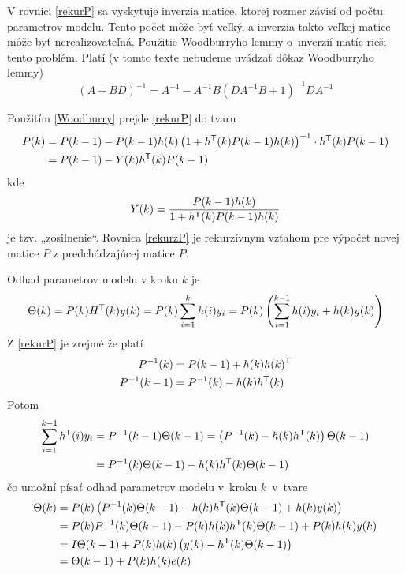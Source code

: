 \documentclass[a4paper, 10pt, ]{article}
\begin{document}
V rovnici \eqref{rekurP} sa vyskytuje inverzia matice, ktorej rozmer závisí od počtu parametrov modelu. Tento počet môže byť veľký, a inverzia takto veľkej matice môže byť nerealizovateľná. Použitie Woodburryho lemmy o~inverzií matíc rieši tento problém. Platí (v tomto texte nebudeme uvádzať dôkaz Woodburryho lemmy)
\begin{equation} \label{Woodburry}
	\left( A + B D \right)^{-1} = A^{-1} - A^{-1} B \left( D A^{-1} B + 1 \right)^{-1} D A^{-1}
\end{equation}

Použitím \eqref{Woodburry} prejde \eqref{rekurP} do tvaru
\begin{equation} \label{rekurzP}
	\begin{split}
		 P(k) & = P(k-1) - P(k-1) h(k) \left( 1 + h^{\mathsf{T}}(k) P(k-1) h(k) \right)^{-1} \cdot h^{\mathsf{T}}(k) P(k-1) \\
		 & = P(k-1) - Y(k) h^{\mathsf{T}}(k) P(k-1)
	\end{split}
\end{equation}
kde
\begin{equation*}
	Y(k) = \frac{P(k-1) h(k)}{1 + h^{\mathsf{T}}(k) P(k-1) h(k)}
\end{equation*}
je tzv. „zosilnenie“. Rovnica \eqref{rekurzP} je rekurzívnym vzťahom pre výpočet novej matice $P$ z predchádzajúcej matice $P$.

Odhad parametrov modelu v kroku $k$ je
\begin{equation}
	\Theta(k) = P(k) H^{\mathsf{T}}(k) y(k) = P(k) \sum_{i = 1}^{k}{h(i) y_i}  =  P(k) \left( \sum_{i = 1}^{k-1}{h(i) y_i} + h(k) y(k) \right)
\end{equation}
Z \eqref{rekurP} je zrejmé že platí
\begin{subequations}
	\begin{align}
		P^{-1}(k) &= P(k-1) + h(k) h(k)^{\mathsf{T}} \\
		P^{-1}(k-1) &= P^{-1}(k) - h(k) h^{\mathsf{T}}(k)
	\end{align}
\end{subequations}
Potom
\begin{equation}
	\begin{split}
		\sum_{i = 1}^{k-1}{h^{\mathsf{T}}(i) y_i} &= P^{-1}(k-1) \Theta(k-1) = \left( P^{-1}(k) - h(k) h^{\mathsf{T}}(k) \right) \Theta(k-1) \\
		&=  P^{-1}(k) \Theta(k-1) - h(k) h^{\mathsf{T}}(k) \Theta(k-1)
	\end{split}
\end{equation}
čo umožní písať odhad parametrov modelu v~kroku $k$~v~tvare
\begin{equation} \label{rekurTheta}
	\begin{split}
		\Theta(k)
		&=
		P(k)
		\left(
			P^{-1}(k)
			\Theta(k-1)
			-
 			h(k)
			h^{\mathsf{T}}(k)
			\Theta(k-1)
			+
			h(k)
			y(k)
		\right)
		\\&=
		P(k)
		P^{-1}(k)
		\Theta(k-1)
		-
		P(k)
		h(k)
		h^{\mathsf{T}}(k)
		\Theta(k-1)
		+
		P(k)
		h(k)
		y(k)
		\\&=
		I
		\Theta(k-1)
		+
		P(k)
		h(k)
		\left(
			y(k)
			-
			h^{\mathsf{T}}(k)
			\Theta(k-1)
		\right)
		\\&=
		\Theta(k-1)
		+
		P(k)
		h(k)
		e(k)
	\end{split}
\end{equation}
\end{document}
